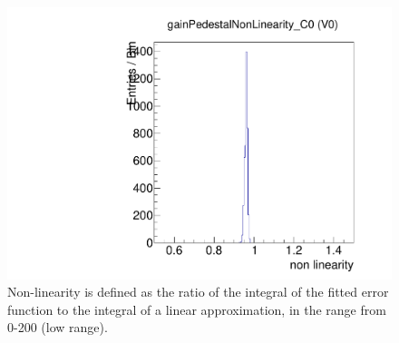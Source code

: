 \begin{figure}[!htp]
\centering
\begin{minipage}{0.45\textwidth}
  \includegraphics[width=1.0\textwidth]{figures/gainped_gainPedestalNonLinearity.pdf}
  \caption{Non-linearity is defined as the ratio of the integral of the fitted error function to the integral of a linear approximation,
           in the \vcal range from 0-200 (low range).}
  \label{fig:gainped_gainPedestalNonLinearity}
\end{minipage}
\end{figure}
